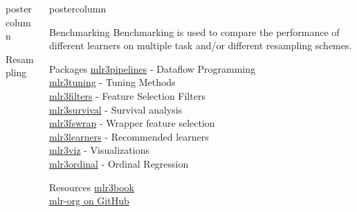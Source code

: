 \documentclass{beamer}
\newlength{\columnheight} %
\begin{document}
\begin{frame}[fragile]{}
\begin{columns}
\begin{column}{.31\textwidth}
\begin{beamercolorbox}[center]{postercolumn}
\begin{minipage}{.98\textwidth}
{\begin{myblock}{Resampling}
					\end{myblock}\vfill
				}
			\end{minipage}
		\end{beamercolorbox}
	\end{column}
	\begin{column}{.31\textwidth}
		\begin{beamercolorbox}[center]{postercolumn}
			\begin{minipage}{.98\textwidth}
				\parbox[t][\columnheight]{\textwidth}{
					\begin{myblock}{Benchmarking}
						Benchmarking is used to compare the performance of different learners on multiple task and/or different resampling schemes.
					\end{myblock}
					\begin{myblock}{Packages}
						\href{https://github.com/mlr-org/mlr3pipelines}{mlr3pipelines} - Dataflow Programming\\
						\href{https://github.com/mlr-org/mlr3tuning}{mlr3tuning} - Tuning Methods\\
						\href{https://github.com/mlr-org/mlr3filters}{mlr3filters} - Feature Selection Filters\\ 
						\href{https://github.com/mlr-org/mlr3survival}{mlr3survival} - Survival analysis\\
						\href{https://github.com/mlr-org/mlr3fswrap}{mlr3fswrap} - Wrapper feature selection\\
						\href{https://github.com/mlr-org/mlr3learners}{mlr3learners} - Recommended learners\\
						\href{https://github.com/mlr-org/mlr3viz}{mlr3viz} - Visualizations \\
						\href{https://github.com/mlr-org/mlr3ordinal}{mlr3ordinal} - Ordinal Regression 
					\end{myblock}
					\begin{myblock}{Resources}
						\href{https://mlr3book.mlr-org.com/index.html}{mlr3book}\\
						\href{https://github.com/mlr-org}{mlr-org on GitHub}
					\end{myblock}\vfill
				}
			\end{minipage}
		\end{beamercolorbox}
	\end{column}
\end{columns}
\end{frame}
\end{document}
